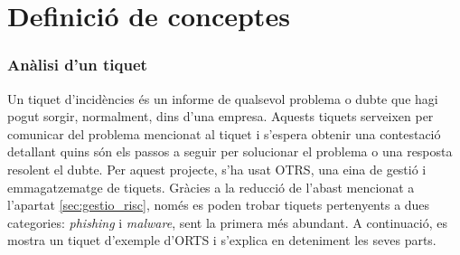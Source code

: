 \section{Definició de conceptes}
\subsubsection{Anàlisi d'un tiquet}
Un tiquet d'incidències és un informe de qualsevol problema o dubte que hagi pogut sorgir, normalment, dins d'una empresa. Aquests tiquets serveixen per comunicar del problema mencionat al tiquet i s'espera obtenir una contestació detallant quins són els passos a seguir per solucionar el problema o una resposta resolent el dubte. Per aquest projecte, s'ha usat OTRS, una eina de gestió i emmagatzematge de tiquets. Gràcies a la reducció de l'abast mencionat a l'apartat \ref{sec:gestio_risc}, només es poden trobar tiquets pertenyents a dues categories: \textit{phishing} i \textit{malware}, sent la primera més abundant. A continuació, es mostra un tiquet d'exemple d'ORTS i s'explica en deteniment les seves parts.

